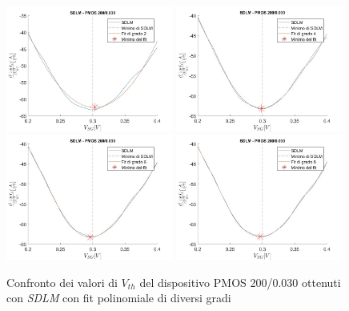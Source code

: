 \documentclass[12pt, letterpaper]{book}
\begin{document}
\begin{figure}[h!]
\label{fig:GradiSDLM} 
\centering
 \includegraphics[width=0.49\textwidth]{SDLM-P1-200-30-grado2}
 \includegraphics[width=0.49\textwidth]{SDLM-P1-200-30-grado4}
 \includegraphics[width=0.49\textwidth]{SDLM-P1-200-30-grado6}
 \includegraphics[width=0.49\textwidth]{SDLM-P1-200-30-grado8}
 \caption{Confronto dei valori di $V_{th}$ del dispositivo PMOS 200/0.030 ottenuti con \emph{SDLM} con fit polinomiale di diversi gradi}
\end{figure}
\end{document}
